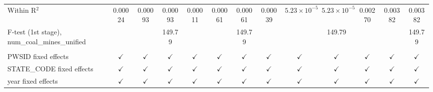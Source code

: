 \begin{table}[htbp]
\begin{adjustbox}{width = \textwidth, center}
\begin{tabular}{lcccccccccccc}
         Within R$^2$                                     & 0.00024       & 0.00093       & 0.00093       & 0.00011       & 0.00061       & 0.00061       & 0.00039       & $5.23\times 10^{-5}$  & $5.23\times 10^{-5}$  & 0.00270        & 0.00382         & 0.00382\\  
         F-test (1st stage), num\_coal\_mines\_unified    &               &               & 149.79        &               &               & 149.79        &               &                       & 149.79                &                &                 & 149.79\\  
          \\
         PWSID fixed effects                              & $\checkmark$  & $\checkmark$  & $\checkmark$  & $\checkmark$  & $\checkmark$  & $\checkmark$  & $\checkmark$  & $\checkmark$          & $\checkmark$          & $\checkmark$   & $\checkmark$    & $\checkmark$\\   
         STATE\_CODE fixed effects                        & $\checkmark$  & $\checkmark$  & $\checkmark$  & $\checkmark$  & $\checkmark$  & $\checkmark$  & $\checkmark$  & $\checkmark$          & $\checkmark$          & $\checkmark$   & $\checkmark$    & $\checkmark$\\   
         year fixed effects                               & $\checkmark$  & $\checkmark$  & $\checkmark$  & $\checkmark$  & $\checkmark$  & $\checkmark$  & $\checkmark$  & $\checkmark$          & $\checkmark$          & $\checkmark$   & $\checkmark$    & $\checkmark$\\   
         \bottomrule
      \end{tabular}
   \end{adjustbox}
\end{table}



